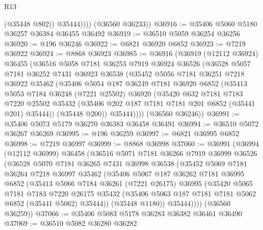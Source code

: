 \begin{lexlean}{R13}
\begin{coremodule}
                (@35448 @802))
              @35444))))
      (@36560 @36233))
@36916 := @35406 @5060 @5180 @36257 @36384 @36455 @36492
@36919 := @36510 @5059 @36254 @36256
@36920 := @196 @36246
@36922 := @6821 @36920 @6852
@36923 := @7219 @36922
@36924 := @8868 @36923
@36985 := @36916
    (@36919
      (@12112 @36924)
      @36455
      (@36516
        @5058
        @7181
        @36253
        @7919
        @36924
        @36526
        (@36528
          @5057
          @7181
          @36252
          @7431
          @36923
          @36538
          (@35452
            @5056
            @7181
            @36251
            @7218
            @36922
            @35462
            (@35406
              @5054
              @187
              @36249
              @7181
              @36920
              @6852
              (@35413
                @5053
                @7184
                @36248
                (@7221 @25502)
                @36920
                (@35420
                  @632
                  @7181
                  @7183
                  @7220
                  @25502
                  @35432
                  (@35406 @202 @187 @7181 @7181 @201 @6852 (@35441 @201) @35444))
                (@35448 @200))
              @35444))))
      (@36560 @36246))
@36991 := @35406 @5073 @5179 @36270 @36383 @36458 @36491
@36994 := @36510 @5072 @36267 @36269
@36995 := @196 @36259
@36997 := @6821 @36995 @6852
@36998 := @7219 @36997
@36999 := @8868 @36998
@37060 := @36991
    (@36994
      (@12112 @36999)
      @36458
      (@36516
        @5071
        @7181
        @36266
        @7919
        @36999
        @36526
        (@36528
          @5070
          @7181
          @36265
          @7431
          @36998
          @36538
          (@35452
            @5069
            @7181
            @36264
            @7218
            @36997
            @35462
            (@35406
              @5067
              @187
              @36262
              @7181
              @36995
              @6852
              (@35413
                @5066
                @7184
                @36261
                (@7221 @26175)
                @36995
                (@35420
                  @5065
                  @7181
                  @7183
                  @7220
                  @26175
                  @35432
                  (@35406 @5063 @187 @7181 @7181 @5062 @6852 (@35441 @5062) @35444))
                (@35448 @1180))
              @35444))))
      (@36560 @36259))
@37066 := @35406 @5083 @5178 @36283 @36382 @36461 @36490
@37069 := @36510 @5082 @36280 @36282

\end{coremodule}
\end{lexlean}
